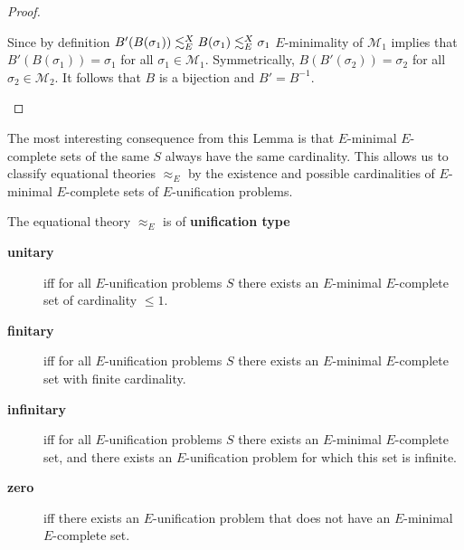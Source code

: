 \begin{proof}
\begin{center}
	\end{center}
	Since by definition $B'(B(\sigma_1))\lesssim^X_E B(\sigma_1)\lesssim^X_E\sigma_1$ $E$-minimality of $\mathcal{M}_1$ implies that $B'(B(\sigma_1))=\sigma_1$ for all $\sigma_1\in\mathcal{M}_1$. Symmetrically, $B(B'(\sigma_2))=\sigma_2$ for all $\sigma_2\in\mathcal{M}_2$. It follows that $B$ is a bijection and $B'=B^{-1}$.
	\begin{center}
	\end{center}
\end{proof}
The most interesting consequence from this Lemma is that $E$-minimal $E$-complete sets of the same $S$ always have the same cardinality. This allows us to classify equational theories $\approx_E$ by the existence and possible cardinalities of $E$-minimal $E$-complete sets of $E$-unification problems.
\begin{definition}
	The equational theory $\approx_E$ is of \textbf{unification type}
	\begin{description}
		\item[\textbf{unitary}] iff for all $E$-unification problems $S$ there exists an $E$-minimal $E$-complete set of cardinality $\leq 1$.
		\item[\textbf{finitary}] iff for all $E$-unification problems $S$ there exists an $E$-minimal $E$-complete set with finite cardinality.
		\item[\textbf{infinitary}] iff for all $E$-unification problems $S$ there exists an $E$-minimal $E$-complete set, and there exists an $E$-unification problem for which this set is infinite.
		\item[\textbf{zero}] iff there exists an $E$-unification problem that does not have an $E$-minimal $E$-complete set.
	\end{description}
\end{definition}
